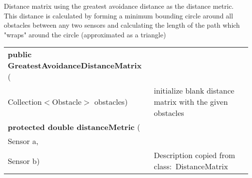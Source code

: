 { Distance matrix using the greatest avoidance distance as the distance metric. This distance is calculated by forming a minimum bounding circle around all obstacles\newline%
 between any two sensors and calculating the length of the path which "wraps" around the circle (approximated as a triangle)
 
\begin{tabular}{ p{3in}|m{3.4in}}
\textbf{public GreatestAvoidanceDistanceMatrix } (\\ \hspace*{ 5pt} Collection$<$Obstacle$>$ obstacles) & initialize blank distance matrix with the given obstacles\\ \hline 
\textbf{protected double distanceMetric } (\\ \hspace*{ 5pt} Sensor a,\\\hspace*{ 5pt} Sensor b) & Description copied from class:~DistanceMatrix\\ \hline 
\end{tabular}
}
